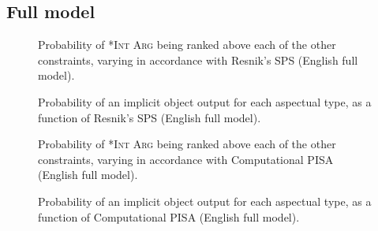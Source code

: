 \subsection{Full model} 


\begin{figure}[H]
\caption{Probability of \textsc{*Int Arg} being ranked above each of the other constraints, varying in accordance with Resnik's SPS (English full model).}
    
\end{figure}

\begin{figure}[H]
\caption{Probability of an implicit object output for each aspectual type, as a function of Resnik's SPS (English full model).}
    
\end{figure}



\begin{figure}[H]
\caption{Probability of \textsc{*Int Arg} being ranked above each of the other constraints, varying in accordance with Computational PISA (English full model).}
    
\end{figure}

\begin{figure}[H]
\caption{Probability of an implicit object output for each aspectual type, as a function of Computational PISA (English full model).}
    
\end{figure}



